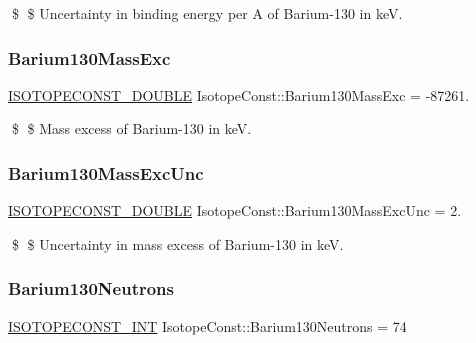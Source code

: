 \$ \$ Uncertainty in binding energy per A of Barium-\/130 in keV. \mbox{\label{group___isotope_const-_barium-_ba130_ga09020dbb8cabb4009ce63230ed5e46fc}} 
\subsubsection{\texorpdfstring{Barium130\+Mass\+Exc}{Barium130MassExc}}
{\footnotesize\ttfamily \mbox{\hyperlink{group___isotope_const-_macros_ga8f45a7272ce02c0b4c65c44636ed719a}{I\+S\+O\+T\+O\+P\+E\+C\+O\+N\+S\+T\+\_\+\+D\+O\+U\+B\+LE}} Isotope\+Const\+::\+Barium130\+Mass\+Exc = -\/87261.}

\$ \$ Mass excess of Barium-\/130 in keV. \mbox{\label{group___isotope_const-_barium-_ba130_gaa2167772cc326adfa70b6d36c7ab5cab}} 
\subsubsection{\texorpdfstring{Barium130\+Mass\+Exc\+Unc}{Barium130MassExcUnc}}
{\footnotesize\ttfamily \mbox{\hyperlink{group___isotope_const-_macros_ga8f45a7272ce02c0b4c65c44636ed719a}{I\+S\+O\+T\+O\+P\+E\+C\+O\+N\+S\+T\+\_\+\+D\+O\+U\+B\+LE}} Isotope\+Const\+::\+Barium130\+Mass\+Exc\+Unc = 2.}

\$ \$ Uncertainty in mass excess of Barium-\/130 in keV. \mbox{\label{group___isotope_const-_barium-_ba130_ga9d125ba7913873a0b5a975f4c5cfa9cb}} 
\subsubsection{\texorpdfstring{Barium130\+Neutrons}{Barium130Neutrons}}
{\footnotesize\ttfamily \mbox{\hyperlink{group___isotope_const-_macros_ga5f18360b3e99483a35c32d789e62621c}{I\+S\+O\+T\+O\+P\+E\+C\+O\+N\+S\+T\+\_\+\+I\+NT}} Isotope\+Const\+::\+Barium130\+Neutrons = 74}

